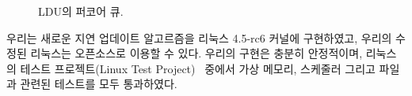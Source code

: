 \begin{figure}[h!]
\begin{center}
\inputminted[linenos,fontsize=\footnotesize,
tabsize=4]{c}{src/ldu_queue_per_core.c}
\end{center}
\caption{LDU의 퍼코어 큐.}
\label{fig:glduphysicalupdate}
\end{figure}





우리는 새로운 지연 업데이트 알고르즘을 리눅스 4.5-rc6 커널에 구현하였고, 우리의 
수정된 리눅스는 오픈소스로 이용할 수 있다.  
우리의 구현은 충분히 안정적이며, 리눅스의 테스트 프로젝트(Linux Test Project)~\cite{LTP}
 중에서 가상 메모리, 스케줄러 그리고 파일과 관련된 테스트를 모두 통과하였다. 
